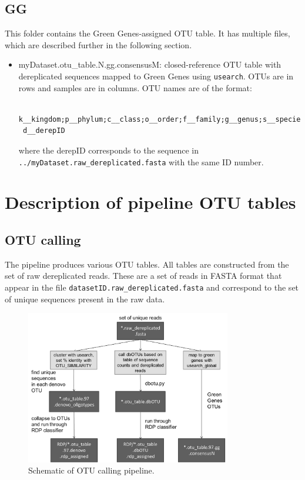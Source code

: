 \documentclass[11pt, oneside]{article}   	%
\begin{document}
\subsection{GG}
This folder contains the Green Genes-assigned OTU table. It has multiple files, which are described further in the following section.
\begin{itemize}
	\item {myDataset.otu\_table.N.gg.consensusM}: closed-reference OTU table with dereplicated sequences mapped to Green Genes using {\tt usearch}. OTUs are in rows and samples are in columns. OTU names are of the format:
\begin{verbatim}
 k__kingdom;p__phylum;c__class;o__order;f__family;g__genus;s__species;
 d__derepID
\end{verbatim} where the derepID corresponds to the sequence in {\tt ../myDataset.raw\_dereplicated.fasta} with the same ID number.
\end{itemize}

\section{Description of pipeline OTU tables}

\subsection{OTU calling}
The pipeline produces various OTU tables.  All tables are constructed from the set of raw dereplicated reads.  These are a set of reads in FASTA format that appear in the file {\tt datasetID.raw\_dereplicated.fasta} and correspond to the set of unique sequences present in the raw data.  

\begin{figure}
\centering
	\includegraphics[width=0.8\textwidth]{figs/OTU_calling.png}
\caption{Schematic of OTU calling pipeline.}
\end{figure}
\end{document}
